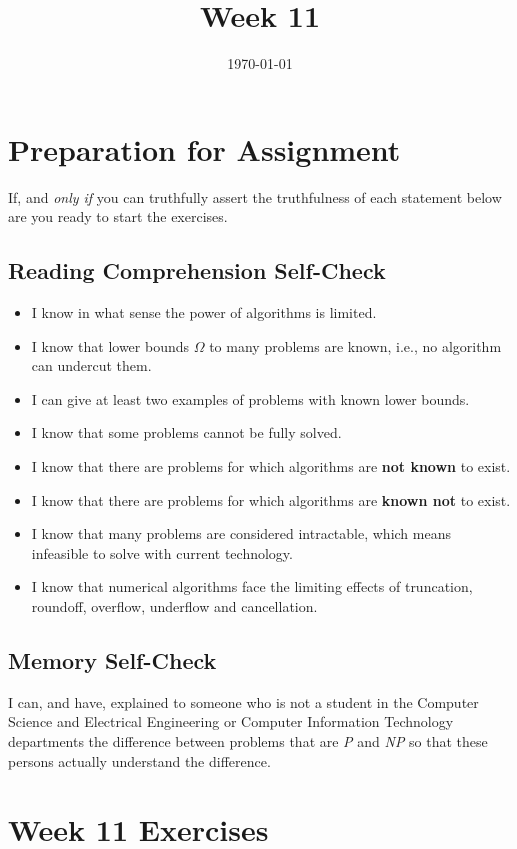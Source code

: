 \documentclass[12pt]{amsart}
\title{Week 11}
\date{\today}
\begin{document}
\maketitle

\section{Preparation for Assignment}
If, and \textit{only if} you can truthfully assert the truthfulness of each statement below are you ready to start the exercises.
\subsection {Reading Comprehension Self-Check}
\begin{itemize}
\item  I know in what sense the power of algorithms is limited.
\item  I know that lower bounds $\Omega$ to many problems are known, i.e., no
    algorithm can undercut them.
\item  I can give at least two examples of problems with known lower bounds.
\item  I know that some problems cannot be fully solved.
\item  I know that there are problems for which algorithms are \textbf{not known} to
    exist.
\item  I know that there are problems for which algorithms are \textbf{known not} to
    exist.
\item  I know that many problems are considered intractable, which means
    infeasible to solve with current technology.
\item  I know that numerical algorithms face the limiting effects of
    truncation, roundoff, overflow, underflow and cancellation.

\end{itemize}
\subsection{Memory Self-Check}
I can, and have, explained to someone who is not a student in the Computer Science and Electrical Engineering or Computer Information Technology departments the difference between problems that are \textit{P} and \textit{NP} so that these persons actually understand the difference. 
 \section{Week 11 Exercises}
\end{document}

